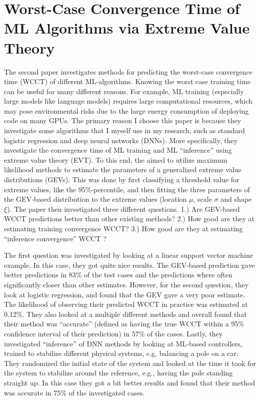\documentclass[a4paper,11pt]{article}
\begin{document}
\section{Worst-Case Convergence Time of ML Algorithms via
Extreme Value Theory}
The second paper \cite{tizpaz2024worst} investigates methods for predicting the worst-case convergence time (WCCT) of different ML-algorithms. Knowing the worst case training time can be useful for many different reasons. For example, ML training (especially large models like language models) requires large computational resources, which may pose environmental risks due to the large energy consumption of deploying code on many GPUs. The primary reason I choose this paper is because they investigate some algorithms that I myself use in my research, such as standard logistic regression and deep neural networks (DNNs). More specifically, they investigate the convergence time of ML training and ML ``inference'' using extreme value theory (EVT). To this end, the aimed to utilize maximum likelihood methods to estimate the parameters of a generalized extreme value distributions (GEVs). This was done by first classifying a threshold value for extreme values, like the 95\%-percentile, and then fitting the three parameters of the GEV-based distribution to the extreme values (location $\mu$, scale $\sigma$ and shape $\xi$). The paper then investigated three different questions. 1.) Are GEV-based WCCT predictions better than other existing methods? 2.) How good are they at estimating training convergence WCCT? 3.) How good are they at estimating ``inference convergence'' WCCT ? 

The first question was investigated by looking at a linear support vector machine example. In this case, they got quite nice results. The GEV-based prediction gave better predictions in 83\% of the test cases and the predictions where often significantly closer than other estimates. However, for the second question, they look at logistic regression, and found that the GEV gave a very poor estimate. The likelihood of observing their predicted WCCT in practice was estimated at 0.12\%. They also looked at a multiple different methods and overall found that their method was ``accurate'' (defined as having the true WCCT within a 95\% confidence interval of their prediction) in 57\% of the cases. Lastly, they investigated ``inference'' of DNN methods by looking at ML-based controllers, trained to stabilize different physical systems, e.g, balancing a pole on a car. They randomized the initial state of the system and looked at the time it took for the system to stabilize around the reference, e.g., having the pole standing straight up. In this case they got a bit better results and found that their method was accurate in 75\% of the investigated cases.
\end{document}
